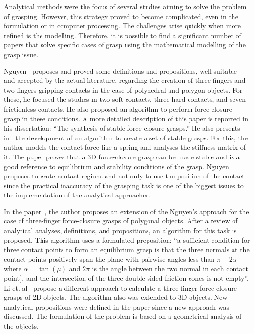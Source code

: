 Analytical methods were the focus of several studies aiming to solve the problem of grasping. However, this strategy proved to become complicated, even in the formulation or in computer processing. The challenges arise quickly when more refined is the modelling. Therefore, it is possible to find a significant number of papers that solve specific cases of grasp using the mathematical modelling of the grasp issue.

Nguyen~\cite{nguyen1987constructing} proposes and proved some definitions and propositions, well suitable and accepted by the actual literature, regarding the creation of three fingers and two fingers gripping contacts in the case of polyhedral and polygon objects. For these, he focused the studies in two soft contacts, three hard contacts, and seven frictionless contacts. He also proposed an algorithm to perform force closure grasp in these conditions. A more detailed description of this paper is reported in his dissertation: “The synthesis of stable force-closure grasps.” He also presents in~\cite{nguyen1989constructing} the development of an algorithm to create a set of stable grasps. For this, the author models the contact force like a spring and analyses the stiffness matrix of it. The paper proves that a 3D force-closure grasp can be made stable and is a good reference to equilibrium and stability conditions of the grasp. Nguyen proposes  to crate contact regions and not only to use the position of the contact since the practical inaccuracy of the grasping task is one of the biggest issues to the implementation of the analytical approaches.

In the paper~\cite{ponce1995computing}, the author proposes an extension of the Nguyen’s approach for the case of three-finger force-closure grasps of polygonal objects. After a review of analytical analyses, definitions, and propositions, an algorithm for this task is proposed. This algorithm uses a formulated preposition: “a sufficient condition for three contact points to form an equilibrium grasp is that the three normals at the contact points positively span the plane with pairwise angles less than $\pi-2\alpha$ where $\alpha=\tan(\mu)$ and $2\pi$ is the angle between the two normal in each contact point), and the intersection of the three double-sided friction cones is not empty”. Li et. al~\cite{li2003computing} propose a different approach to calculate a three-finger force-closure grasps of 2D objects. The algorithm also was extended to 3D objects. New analytical propositions were defined in the paper since a new approach was discussed. The formulation of the problem is based on a geometrical analysis of the objects. 

